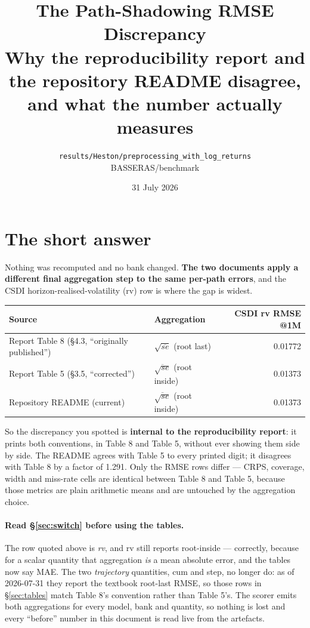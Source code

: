 \documentclass[11pt,a4paper]{article}
\title{\textbf{The Path-Shadowing RMSE Discrepancy}\\[0.3em]
\large Why the reproducibility report and the repository README disagree,\\
and what the number actually measures}
\author{\texttt{results/Heston/preprocessing\_with\_log\_returns}\\
BASSERAS/benchmark}
\date{31 July 2026}
\begin{document}
\maketitle

\tableofcontents
\clearpage

\section{The short answer}

Nothing was recomputed and no bank changed. \textbf{The two documents apply a
different final aggregation step to the same per-path errors}, and the CSDI
horizon-realised-volatility (rv) row is where the gap is widest.

\begin{center}
\begin{tabular}{llr}
\toprule
Source & Aggregation & CSDI rv RMSE @1M \\
\midrule
Report Table 8 (\S4.3, ``originally published'') & $\sqrt{\overline{se}}$ (root last) & 0.01772 \\
Report Table 5 (\S3.5, ``corrected'') & $\overline{\sqrt{se}}$ (root inside) & 0.01373 \\
Repository README (current) & $\overline{\sqrt{se}}$ (root inside) & 0.01373 \\
\bottomrule
\end{tabular}
\end{center}

So the discrepancy you spotted is \textbf{internal to the reproducibility
report}: it prints both conventions, in Table 8 and Table 5, without ever
showing them side by side. The README agrees with Table 5 to every printed
digit; it disagrees with Table 8 by a factor of 1.291. Only the RMSE rows differ
--- CRPS, coverage, width and miss-rate cells are identical between Table 8 and
Table 5, because those metrics are plain arithmetic means and are untouched by
the aggregation choice.

\paragraph{Read \S\ref{sec:switch} before using the tables.} The row quoted
above is \emph{rv}, and rv still reports root-inside --- correctly, because for a
scalar quantity that aggregation \emph{is} a mean absolute error, and the tables
now say MAE. The two \emph{trajectory} quantities, cum and step, no longer do:
as of 2026-07-31 they report the textbook root-last RMSE, so those rows in
\S\ref{sec:tables} match Table 8's convention rather than Table 5's. The scorer
emits both aggregations for every model, bank and quantity, so nothing is lost
and every ``before'' number in this document is read live from the artefacts.
\end{document}
